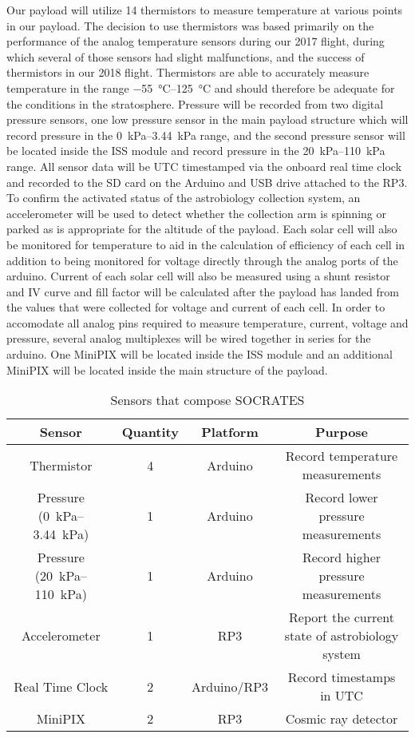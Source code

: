Our payload will utilize 14 thermistors to measure temperature at various points in our payload. The decision to use thermistors was based primarily on the performance of the analog temperature sensors during our 2017 flight, during which several of those sensors had slight malfunctions, and the success of thermistors in our 2018 flight. Thermistors are able to accurately measure temperature in the range \SIrange{-55}{125}{\celsius} and should therefore be adequate for the conditions in the stratosphere. Pressure will be recorded from two digital pressure sensors, one low pressure sensor in the main payload structure which will record pressure in the \SIrange{0}{3.44}{\kilo\pascal} range, and the second pressure sensor will be located inside the ISS module and record pressure in the \SIrange{20}{110}{\kilo\pascal} range. All sensor data will be UTC timestamped via the onboard real time clock and recorded to the SD card on the Arduino and USB drive attached to the RP3. To confirm the activated status of the astrobiology collection system, an accelerometer will be used to detect whether the collection arm is spinning or parked as is appropriate for the altitude of the payload. Each solar cell will also be monitored for temperature to aid in the calculation of efficiency of each cell in addition to being monitored for voltage directly through the analog ports of the arduino. Current of each solar cell will also be measured using a shunt resistor and IV curve and fill factor will be calculated after the payload has landed from the values that were collected for voltage and current of each cell. In order to accomodate all analog pins required to measure temperature, current, voltage and pressure, several analog multiplexes will be wired together in series for the arduino. One MiniPIX will be located inside the ISS module and an additional MiniPIX will be located inside the main structure of the payload.

\begin{table}[h!]
\centering
\caption{Sensors that compose SOCRATES}
\label{tab:Sensors}
\bigskip
\begin{tabular}{cccc}
  \hline
  \hline
  \multicolumn{1}{c}{\bfseries Sensor} & {\bfseries Quantity} & {\bfseries Platform} & {\bfseries Purpose} \\
  \hline
  Thermistor          		& 4 & Arduino  		& Record temperature measurements  \\
  Pressure (\SIrange{0}{3.44}{\kilo\pascal})        				& 1 & Arduino 		& Record lower pressure measurements \\
  Pressure (\SIrange{20}{110}{\kilo\pascal})        				& 1 & Arduino 		& Record higher pressure measurements \\
  Accelerometer       		& 1 & RP3    		& Report the current state of astrobiology system \\
  Real Time Clock 				& 2 & Arduino/RP3 	& Record timestamps in UTC \\
  MiniPIX         				& 2 & RP3     		& Cosmic ray detector \\
  \hline
  \hline
\end{tabular}
\end{table}


